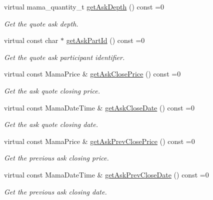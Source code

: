 \begin{CompactItemize}
virtual mama\_\-quantity\_\-t \hyperlink{classWombat_1_1MamdaQuoteRecap_fa0c912ad4721709726ceca9d7923fd2}{get\-Ask\-Depth} () const =0
\begin{CompactList}\small\item\em Get the quote ask depth. \item\end{CompactList}\item 
virtual const char $\ast$ \hyperlink{classWombat_1_1MamdaQuoteRecap_aac45c1c6970f8b6a4a7b318d36bda7d}{get\-Ask\-Part\-Id} () const =0
\begin{CompactList}\small\item\em Get the quote ask participant identifier. \item\end{CompactList}\item 
virtual const Mama\-Price \& \hyperlink{classWombat_1_1MamdaQuoteRecap_903eb978e89cd7b89363c03a7e86f726}{get\-Ask\-Close\-Price} () const =0
\begin{CompactList}\small\item\em Get the ask quote closing price. \item\end{CompactList}\item 
virtual const Mama\-Date\-Time \& \hyperlink{classWombat_1_1MamdaQuoteRecap_4f95ffdb921180d5a7a5d6f488b6014c}{get\-Ask\-Close\-Date} () const =0
\begin{CompactList}\small\item\em Get the ask quote closing date. \item\end{CompactList}\item 
virtual const Mama\-Price \& \hyperlink{classWombat_1_1MamdaQuoteRecap_521a7513135af4b11b964473ce74bc88}{get\-Ask\-Prev\-Close\-Price} () const =0
\begin{CompactList}\small\item\em Get the previous ask closing price. \item\end{CompactList}\item 
virtual const Mama\-Date\-Time \& \hyperlink{classWombat_1_1MamdaQuoteRecap_f18eefde8f4c853642da3176bb7cf84e}{get\-Ask\-Prev\-Close\-Date} () const =0
\begin{CompactList}\small\item\em Get the previous ask closing date. \item\end{CompactList}\item 

\end{CompactItemize}
